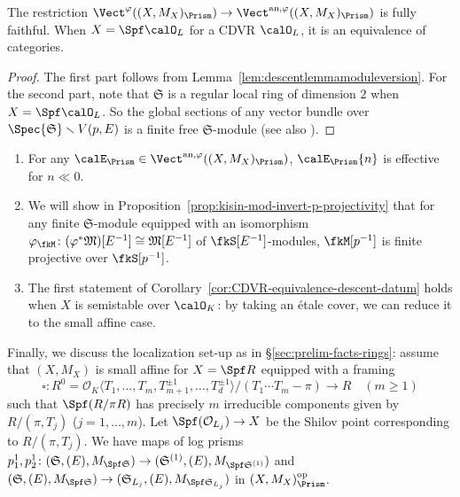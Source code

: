 \begin{cor} \label{cor:CDVR-equivalence-descent-datum}
The restriction $\Vect^{\varphi}((X,M_X)_\Prism)\rightarrow\Vect^{\mathrm{an},\varphi}((X,M_X)_\Prism)$ is fully faithful. When $X = \Spf\calO_L$ for a CDVR $\calO_L$, it is an equivalence of categories. 
\end{cor}

\begin{proof}
The first part follows from Lemma~\ref{lem:descentlemmamoduleversion}. For the second part, note that $\mathfrak{S}$ is a regular local ring of dimension $2$ when $X = \Spf\calO_L$. So the global sections of any vector bundle over $\Spec{\mathfrak{S}}\smallsetminus V(p,E)$ is a finite free $\mathfrak{S}$-module (see also \cite[Rem.~3.18]{du-liu-moon-shimizu-completed-prismatic-F-crystal-loc-system}). 
\end{proof}


\begin{rem} \hfill
\begin{enumerate}
\item For any $\calE_\Prism \in \Vect^{\mathrm{an},\varphi}((X,M_X)_\Prism)$, $\calE_\Prism\{n\}$ is effective for $n \ll 0$.
\item We will show in Proposition~\ref{prop:kisin-mod-invert-p-projectivity} that for any finite $\mathfrak{S}$-module equipped with an isomorphism $\varphi_\fkM\colon (\varphi^*\mathfrak{M})[E^{-1}] \cong \mathfrak{M}[E^{-1}]$ of $\fkS[E^{-1}]$-modules, $\fkM[p^{-1}]$ is finite projective over $\fkS[p^{-1}]$.
\item The first statement of Corollary~\ref{cor:CDVR-equivalence-descent-datum} holds when $X$ is semistable over $\calO_K$: by taking an \'etale cover, we can reduce it to the small affine case. 
\end{enumerate}
\end{rem}

Finally, we discuss the localization set-up as in \S\ref{sec:prelim-facts-rings}: assume that $(X,M_X)$ is small affine for $X = \Spf R$ equipped with a framing 
\[
\square\colon R^{0} = \mathcal{O}_K \langle T_1, \ldots, T_m, T_{m+1}^{\pm 1}, \ldots, T_d^{\pm 1}\rangle / (T_1\cdots T_m - \pi) \rightarrow R \quad (m \geq 1)
\]
such that $\Spf (R/\pi R)$ has precisely $m$ irreducible components given by $R/(\pi, T_j)$ ($j = 1, \ldots, m$). Let $\Spf(\mathcal{O}_{L_j}) \rightarrow X$ be the Shilov point corresponding to $R/(\pi, T_j)$. We have maps of log prisms  $p_1^1,p_2^1\colon (\mathfrak{S}, (E), M_{\Spf \mathfrak{S}})\rightarrow (\mathfrak{S}^{(1)}, (E), M_{\Spf \mathfrak{S}^{(1)}})$ and $(\mathfrak{S}, (E), M_{\Spf \mathfrak{S}}) \rightarrow (\mathfrak{S}_{L_j}, (E), M_{\Spf \mathfrak{S}_{L_j}})$ in $(X, M_X)_{\Prism}^\mathrm{op}$.  

